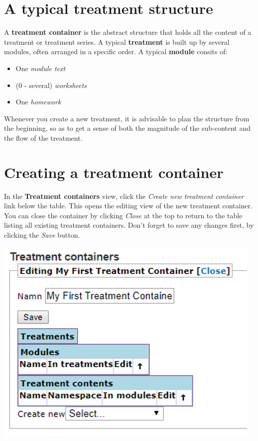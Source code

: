 \documentclass[
]{book}
\providecommand{\tightlist}{%
  \setlength{\itemsep}{0pt}\setlength{\parskip}{0pt}}
\begin{document}
\section{A typical treatment structure}\label{a-typical-treatment-structure}

A \textbf{treatment container} is the abstract structure that holds all the content of a treatment or treatment series. A typical \textbf{treatment} is built up by several modules, often arranged in a specific order. A typical \textbf{module} consits of:

\begin{itemize}
\tightlist
\item
  One \emph{module text}
\item
  (0 - several) \emph{worksheets}
\item
  One \emph{homework}
\end{itemize}

Whenever you create a new treatment, it is advisable to plan the structure from the beginning, so as to get a sense of both the magnitude of the sub-content and the flow of the treatment.

\section{Creating a treatment container}\label{creating-a-treatment-container}

In the \textbf{Treatment containers} view, click the \emph{Create new treatment container} link below the table. This opens the editing view of the new treatment container. You can close the container by clicking \emph{Close} at the top to return to the table listing all existing treatment containers. Don't forget to save any changes first, by clicking the \emph{Save} button.

\includegraphics{images/new-images/treatmentsEditContainer.png}
\end{document}
